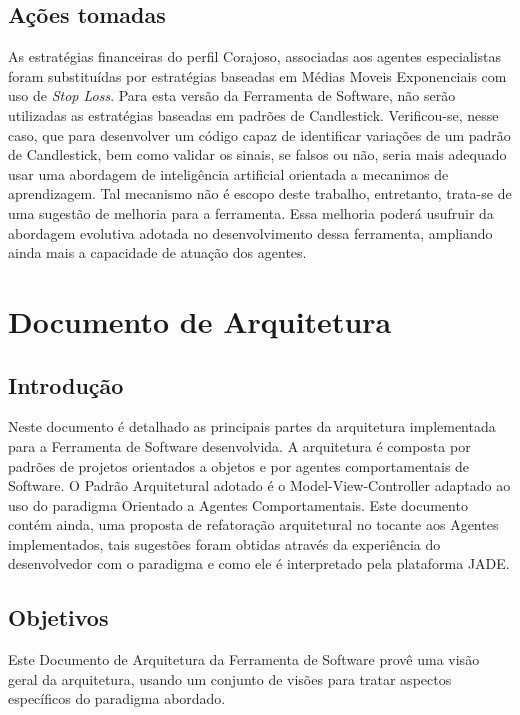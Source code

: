 \begin{apendicesenv}
\begin{center}
\begin{longtable}{| p{4cm} | p{4cm} |p{4cm} |p{2cm} |}
\label{t1}
\end{longtable}
\end{center}


\section{Ações  tomadas} 

As estratégias financeiras do perfil Corajoso, associadas aos agentes especialistas foram substituídas por estratégias baseadas em Médias Moveis Exponenciais com uso de \textit{Stop Loss}. Para esta versão da Ferramenta de Software, não serão utilizadas as estratégias baseadas em padrões de Candlestick. Verificou-se, nesse caso, que para desenvolver um código capaz de identificar variações de um padrão de Candlestick, bem como validar os sinais, se falsos ou não, seria mais adequado usar uma abordagem de inteligência artificial orientada a mecanimos de aprendizagem. Tal mecanismo não é escopo deste trabalho, entretanto, trata-se de uma sugestão de melhoria para a ferramenta. Essa melhoria poderá usufruir da abordagem evolutiva adotada no desenvolvimento dessa ferramenta, ampliando ainda mais a capacidade de atuação dos agentes.


\chapter[DOCUMENTO DE ARQUITETURA]{Documento de Arquitetura}
\section{Introdução}

Neste documento é detalhado as principais partes da arquitetura implementada para a Ferramenta de Software desenvolvida.  A arquitetura é composta por padrões de projetos orientados a objetos e por agentes comportamentais de Software. O Padrão Arquitetural adotado é o Model-View-Controller adaptado ao uso do paradigma Orientado a Agentes Comportamentais. Este documento contém ainda, uma proposta de refatoração arquitetural no tocante aos Agentes implementados, tais sugestões foram obtidas através da experiência do desenvolvedor com o paradigma e como ele é interpretado pela plataforma JADE.

\section{Objetivos}

Este Documento de Arquitetura da Ferramenta de Software provê uma visão geral da arquitetura, usando um conjunto de visões para tratar aspectos específicos do paradigma abordado. 


\end{apendicesenv}
